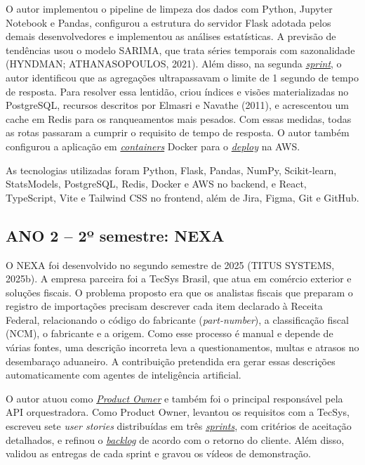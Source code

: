 \documentclass[12pt,a4paper]{article}
\newcommand{\termo}[2]{\hyperlink{gls:#1}{\textit{#2}}}
\begin{document}
O autor implementou o pipeline de limpeza dos dados com Python, Jupyter Notebook e Pandas, configurou a estrutura do servidor Flask adotada pelos demais desenvolvedores e implementou as análises estatísticas. A previsão de tendências usou o modelo SARIMA, que trata séries temporais com sazonalidade (HYNDMAN; ATHANASOPOULOS, 2021). Além disso, na segunda \termo{sprint}{sprint}, o autor identificou que as agregações ultrapassavam o limite de 1 segundo de tempo de resposta. Para resolver essa lentidão, criou índices e visões materializadas no PostgreSQL, recursos descritos por Elmasri e Navathe (2011), e acrescentou um cache em Redis para os ranqueamentos mais pesados. Com essas medidas, todas as rotas passaram a cumprir o requisito de tempo de resposta. O autor também configurou a aplicação em \termo{container}{containers} Docker para o \termo{deploy}{deploy} na AWS.

As tecnologias utilizadas foram Python, Flask, Pandas, NumPy, Scikit-learn, StatsModels, PostgreSQL, Redis, Docker e AWS no backend, e React, TypeScript, Vite e Tailwind CSS no frontend, além de Jira, Figma, Git e GitHub.

\subsection{ANO 2 – 2º semestre: NEXA}

O NEXA foi desenvolvido no segundo semestre de 2025 (TITUS SYSTEMS, 2025b). A empresa parceira foi a TecSys Brasil, que atua em comércio exterior e soluções fiscais. O problema proposto era que os analistas fiscais que preparam o registro de importações precisam descrever cada item declarado à Receita Federal, relacionando o código do fabricante (\textit{part-number}), a classificação fiscal (NCM), o fabricante e a origem. Como esse processo é manual e depende de várias fontes, uma descrição incorreta leva a questionamentos, multas e atrasos no desembaraço aduaneiro. A contribuição pretendida era gerar essas descrições automaticamente com agentes de inteligência artificial.

O autor atuou como \termo{po}{Product Owner} e também foi o principal responsável pela API orquestradora. Como Product Owner, levantou os requisitos com a TecSys, escreveu sete \textit{user stories} distribuídas em três \termo{sprint}{sprints}, com critérios de aceitação detalhados, e refinou o \termo{backlog}{backlog} de acordo com o retorno do cliente. Além disso, validou as entregas de cada sprint e gravou os vídeos de demonstração.
\end{document}
